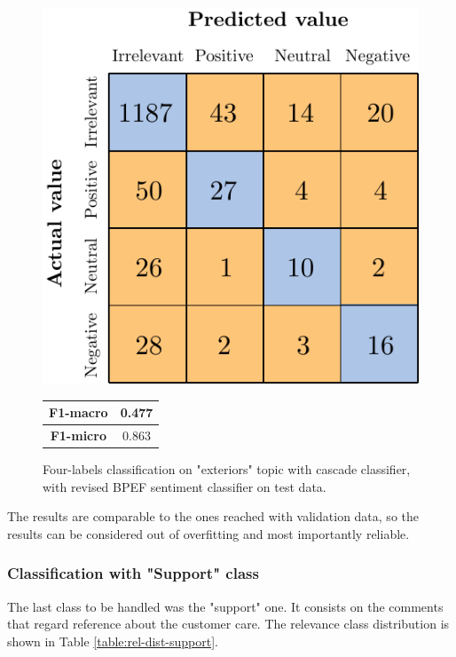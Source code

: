 \begin{figure}[H]
	\begin{minipage}[b]{0.6\linewidth}
		\centering
		\includegraphics[scale=1]{figures/conf_matrices/ita_exteriors/ita_cascade_exteriors_bpef_tst.pdf}
	\end{minipage}
	\begin{minipage}[b]{0.3\linewidth}
		\begin{tabular}[b]{ | c | c | } 
			\hline
			\textbf{F1-macro} & 0.477 \\
			\hline
			\textbf{F1-micro} & 0.863 \\ 
			\hline
		\end{tabular}
	\end{minipage}
	\caption{Four-labels classification on "exteriors" topic with cascade classifier, with revised BPEF sentiment classifier on test data.}
	\label{fig:ita_cascade_exteriors_bpef_tst}
\end{figure}


The results are comparable to the ones reached with validation data, so the results can be considered out of overfitting and most importantly reliable.

\subsubsection{Classification with "Support" class}

The last class to be handled was the "support" one. It consists on the comments that regard reference about the customer care. The relevance class distribution is shown in Table \ref{table:rel-dist-support}. 

